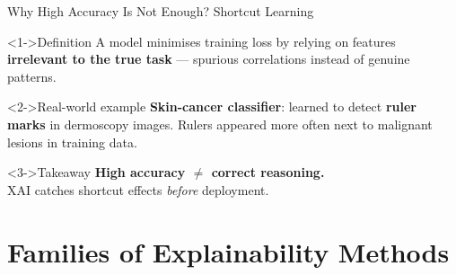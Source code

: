 \documentclass[aspectratio=169]{beamer}
\newcommand{\highlight}[1]{\textcolor{xaiaccent}{\textbf{#1}}}
\begin{document}
\begin{frame}{Why High Accuracy Is Not Enough? Shortcut Learning}
  \begin{alertblock}<1->{Definition}
    A model minimises training loss by relying on features \textbf{irrelevant to
    the true task} --- spurious correlations instead of genuine patterns.
  \end{alertblock}
  \vspace{0.4em}
  \begin{block}<2->{Real-world example}
    \textbf{Skin-cancer classifier}: learned to detect \highlight{ruler marks} in
    dermoscopy images. Rulers appeared more often next to malignant lesions in
    training data.
  \end{block}
  \vspace{0.4em}
  \begin{block}<3->{Takeaway}
    \highlight{High accuracy $\neq$ correct reasoning.}\\
    XAI catches shortcut effects \emph{before} deployment.
  \end{block}
\end{frame}

\section{Families of Explainability Methods}
\end{document}
